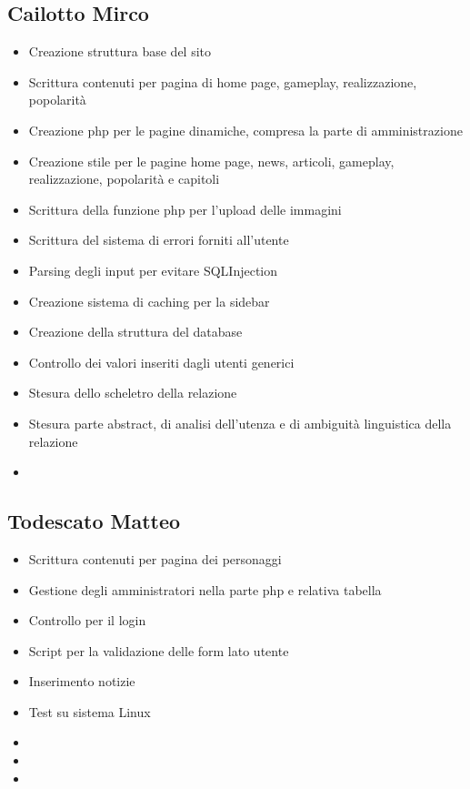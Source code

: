 \documentclass[openany, a4paper, 12pt]{report}
\begin{document}
	\subsection{Cailotto Mirco}
	\begin{itemize}
		\item Creazione struttura base del sito
		\item Scrittura contenuti per pagina di home page, gameplay, realizzazione, popolarità
		\item Creazione php per le pagine dinamiche, compresa la parte di amministrazione
		\item Creazione stile per le pagine home page, news, articoli, gameplay, realizzazione, popolarità e capitoli
		\item Scrittura della funzione php per l'upload delle immagini
		\item Scrittura del sistema di errori forniti all'utente
		\item Parsing degli input per evitare SQLInjection
		\item Creazione sistema di caching per la sidebar
		\item Creazione della struttura del database
		\item Controllo dei valori inseriti dagli utenti generici
		\item Stesura dello scheletro della relazione
		\item Stesura parte abstract, di analisi dell'utenza e di ambiguità linguistica della relazione
		\item 
	\end{itemize}
	\subsection{Todescato Matteo}
	\begin{itemize}
		\item Scrittura contenuti per pagina dei personaggi
		\item Gestione degli amministratori nella parte php e relativa tabella
		\item Controllo per il login
		\item Script per la validazione delle form lato utente
		\item Inserimento notizie
		\item Test su sistema Linux
		\item 
		\item 
		\item 
	\end{itemize}
\end{document}
